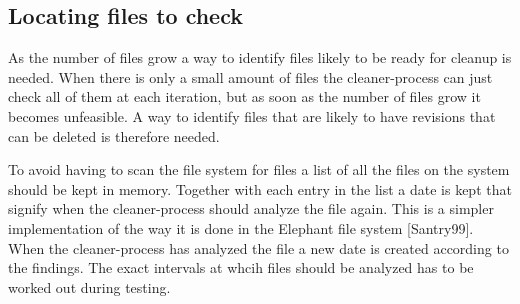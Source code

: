 \documentclass[12pt]{article}
\begin{document}
\subsection{Locating files to check}
As the number of files grow a way to identify files likely to be ready for cleanup is needed. When there is only a small amount of files the cleaner-process can just check all of them at each iteration, but as soon as the number of files grow it becomes unfeasible. A way to identify files that are likely to have revisions that can be deleted is therefore needed.

To avoid having to scan the file system for files a list of all the files on the system should be kept in memory. Together with each entry in the list a date is kept that signify when the cleaner-process should analyze the file again. This is a simpler implementation of the way it is done in the Elephant file system [Santry99]. When the cleaner-process has analyzed the file a new date is created according to the findings. The exact intervals at whcih files should be analyzed has to be worked out during testing.






 
\end{document}
